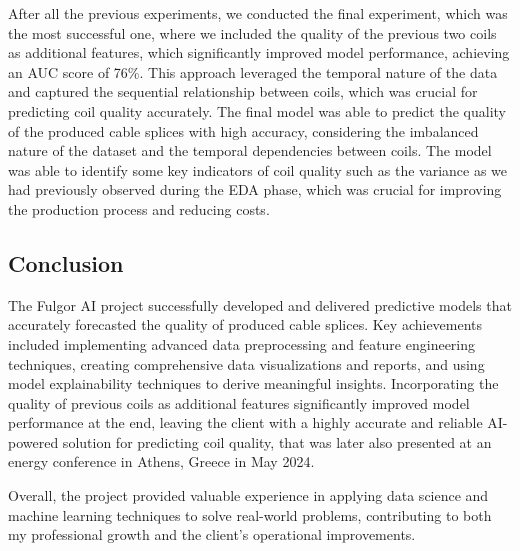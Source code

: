 After all the previous experiments, we conducted the final experiment, which
was the most successful one, where we included the quality of the previous two
coils as additional features, which significantly improved model performance,
achieving an AUC score of 76\%. This approach leveraged the temporal nature of
the data and captured the sequential relationship between coils, which was
crucial for predicting coil quality accurately. The final model was able to
predict the quality of the produced cable splices with high accuracy,
considering the imbalanced nature of the dataset and the temporal dependencies
between coils. The model was able to identify some key indicators of coil
quality such as the variance as we had previously observed during the EDA
phase, which was crucial for improving the production process and reducing
costs.

\subsection{Conclusion}

The Fulgor AI project successfully developed and delivered predictive models
that accurately forecasted the quality of produced cable splices. Key
achievements included implementing advanced data preprocessing and feature
engineering techniques, creating comprehensive data visualizations and reports,
and using model explainability techniques to derive meaningful insights.
Incorporating the quality of previous coils as additional features
significantly improved model performance at the end, leaving the client with a
highly accurate and reliable AI-powered solution for predicting coil quality,
that was later also presented at an energy conference in Athens, Greece in May
2024.

Overall, the project provided valuable experience in applying data science and
machine learning techniques to solve real-world problems, contributing to both
my professional growth and the client's operational improvements.
